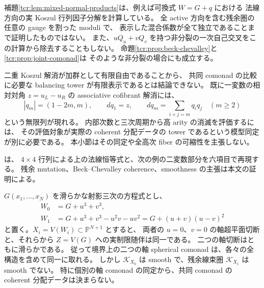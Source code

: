 \begin{remark}[有限計算と全分配データの区別]
\label{tcr:rem:balancing-scope}
補題\ref{tcr:lem:mixed-normal-products}は、例えば可換式 $W=G+q$ における
法線方向の実 Koszul 行列因子分解を計算している。
全 active 方向を含む残余圏の任意の gauge を割った moduli で、
表示した混合係数が全て独立であることまで証明したものではない。
また、$uQ_u+vQ_v$ を持つ非分裂の一次自己交叉をこの計算から除去することもしない。
命題\ref{tcr:prop:beck-chevalley}と\ref{tcr:prop:joint-comonad}は
そのような非分裂の場合にも成立する。

二重 Koszul 解消が加群として有限自由であることから、
共同 comonad の比較に必要な balancing tower が有限表示であるとは結論できない。
既に一変数の相対対角 $z=u_L-u_R$ の associative cofibrant 解消には、
\[
 |q_m|=(1-2m,m),\qquad dq_1=z,\qquad
 dq_m=\sum_{i+j=m}q_iq_j\quad(m\ge2)
\]
という無限列が現れる。
内部次数と三次周期から高 arity の消滅を評価するには、
その評価対象が実際の coherent 分配データの tower であるという模型同定が別に必要である。
本小節はその同定や全高次 fiber の可縮性を主張しない。

は、
$4\times4$ 行列による上の法線恒等式と、次の例の二変数部分を六項目で再現する。
残余 mutation、Beck--Chevalley coherence、smoothness の主張は本文の証明による。
\end{remark}

\begin{example}[同一の滑らかな軸と異なる全残余圏]
\label{tcr:ex:same-axes}
$G(x_1,\ldots,x_N)$ を滑らかな射影三次の方程式とし、
\[
 \begin{aligned}
 W_0&=G+u^3+v^3,\\
 W_1&=G+u^3+v^3-u^2v-uv^2
      =G+(u+v)(u-v)^2
 \end{aligned}
\]
と置く。$X_i=V(W_i)\subset\mathbb P^{N+1}$ とすると、
両者の $u=0$、$v=0$ の軸超平面切断と、それらから
$Z=V(G)$ への実制限随伴は同一である。
二つの軸切断はともに滑らかである。
従って境界上の二つの軸 spherical comonad は、各々の全構造を含めて同一に取れる。
しかし $\mathcal K_{X_0}$ は smooth で、残余線束圏 $\mathcal K_{X_1}$ は smooth でない。
特に個別の軸 comonad の同定から、共同 comonad の coherent 分配データは決まらない。
\end{example}

